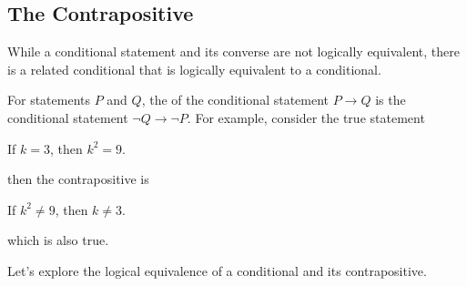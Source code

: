\newcommand{\subcp}{The Contrapositive}
\subsection{\subcp}
\label{sub_contrapositive}

While a conditional statement and its converse are not logically equivalent, there is a related conditional that is logically equivalent to a conditional.

\begin{defn}[Contrapositive]
\label{defn_contrapositive} 
    For statements $P$ and $Q$, the  of the conditional statement $P \to Q$ is the conditional statement $\neg Q \to \neg P$. For example, consider the true statement 
        \begin{center}
            If $k=3$, then $k^2=9$.
        \end{center}
    then the contrapositive is
        \begin{center}
            If $k^2 \neq 9$, then $k \neq 3$.
        \end{center}
    which is also true.
\end{defn}

Let's explore the logical equivalence of a conditional and its contrapositive.

